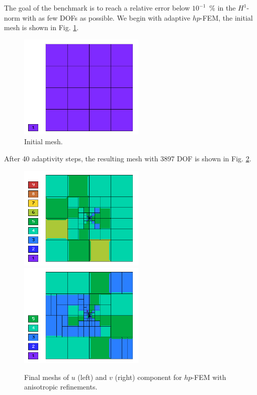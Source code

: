 \documentclass[12pt]{elsarticle}
\begin{document}
The goal of the benchmark is to reach a relative error below
$10^{-1}$~\% in the $H^1$-norm with as few DOFs as possible.
We begin with adaptive $hp$-FEM,
the initial mesh is shown in Fig. \ref{fig:nist-3-hp-aniso-init}.

\begin{figure}[!ht]
\centering
\includegraphics[height=5cm]{nist/nist-3/mesh_hp_aniso_init.png}
\caption{Initial mesh.}
\label{fig:nist-3-hp-aniso-init}
\end{figure}

After 40 adaptivity steps,
the resulting mesh with 3897 DOF is shown in Fig. \ref{fig:nist-3-hp-aniso}.

\begin{figure}[!ht]
\centering
\includegraphics[height=5cm]{nist/nist-3/mesh_u_hp_anisoh.png}\ \
\includegraphics[height=5cm]{nist/nist-3/mesh_v_hp_anisoh.png}
\caption{Final meshs of $u$ (left) and $v$ (right) component for $hp$-FEM with anisotropic refinements.}
\label{fig:nist-3-hp-aniso}
\end{figure}
\end{document}
